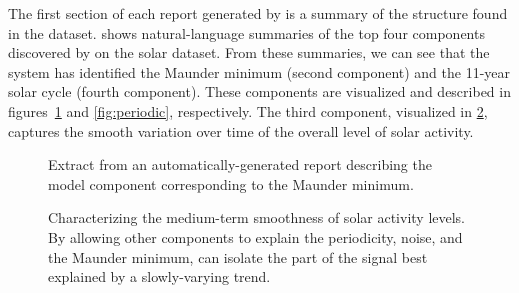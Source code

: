 The first section of each report generated by \procedurename{} is a summary of the structure found in the dataset.
 shows natural-language summaries of the top four components discovered by \procedurename{} on the solar dataset.
From these summaries, we can see that the system has identified the Maunder minimum (second component) and the 11-year solar cycle (fourth component).
These components are visualized and described in figures~\ref{fig:maunder} and \ref{fig:periodic}, respectively. 
The third component, visualized in \cref{fig:smooth}, captures the smooth variation over time of the overall level of solar activity.
%
\begin{figure}[ht!]%
\centering
{}
\caption[A component corresponding to the Maunder minimum]
{Extract from an automatically-generated report describing the model component corresponding to the Maunder minimum.}
\label{fig:maunder}
\end{figure}

\begin{figure}[ht!]
\centering
{}
\caption[\procedurename{} isolating part of the signal explained by a slowly-varying trend]
{Characterizing the medium-term smoothness of solar activity levels.
By allowing other components to explain the periodicity, noise, and the Maunder minimum, \procedurename{} can isolate the part of the signal best explained by a slowly-varying trend.}
\label{fig:smooth}
\end{figure}

